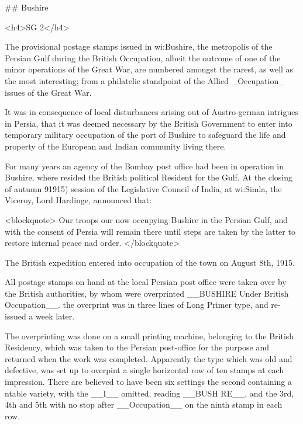 
\#\# Bushire

<h4>SG 2</h4>


The provisional postage stamps issued in wi:Bushire, the metropolis of the Persian Gulf during the British
Occupation, albeit the outcome of one of the minor operations of the Great War, are numbered amongst the rarest, as well as the
most interesting; from a philatelic standpoint of the Allied _Occupation_ issues of the Great War.

It was in consequence of local disturbances arising out of Austro-german intrigues in Persia, that it
was deemed necessary by the British Government to enter into temporary military occupation of the port
of Bushire to safeguard the life and property of the European and Indian community living there.

For many years an agency of the Bombay post office had been in operation in Bushire, where resided the
British political Resident for the Gulf. At the closing of autumn 91915) session of
the Legislative Council of India, at wi:Simla, the Viceroy, Lord Hardinge, announced that:

<blockquote>
Our troops our now occupying Bushire in the Persian Gulf, and with the consent of Persia will remain
there until steps are taken by the latter to restore internal peace nad order.
</blockquote>

The British expedition entered into occupation of the town on August 8th, 1915.

All postage stamps on hand at the local Persian post office were taken over by the British authorities, by whom were overprinted
__BUSHIRE Under British Occupation__. the overprint was in three lines of Long Primer type, and re-issued a week later.

The overprinting was done on a small printing machine, belonging to the British Residency, which was taken to the Persian post-office for the purpose and
returned when the work was completed. Apparently the type which was old and defective, was set up to overpint a single horizontal
row of ten stamps at each impression. There are believed to have been six settings the second containing a ntable variety,
with the __I__ omitted, reading __BUSH RE__, and the 3rd, 4th and 5th with no stop after
__Occupation__ on the ninth stamp in each row.

